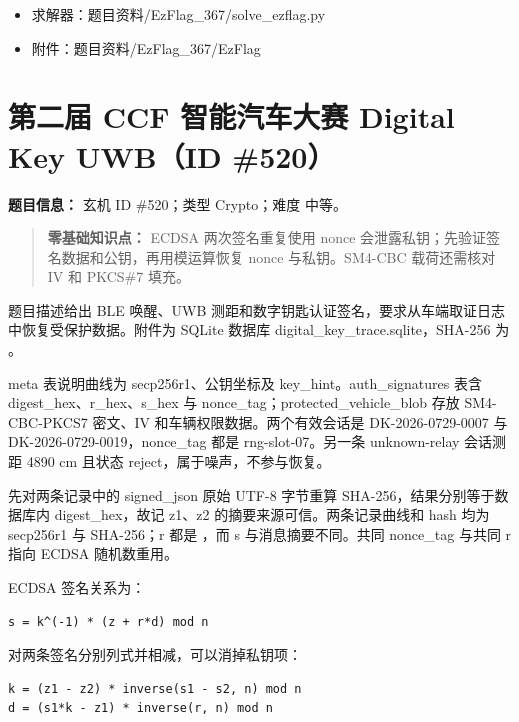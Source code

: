 \begin{itemize}
\tightlist
\item
  求解器：题目资料/EzFlag\_367/solve\_ezflag.py
\item
  附件：题目资料/EzFlag\_367/EzFlag
\end{itemize}

\section{第二届 CCF 智能汽车大赛 Digital Key UWB（ID \#520）}\label{ux7b2cux4e8cux5c4a-ccf-ux667aux80fdux6c7dux8f66ux5927ux8d5b-digital-key-uwbid-520}

\textbf{题目信息：} 玄机 ID \#520；类型 Crypto；难度 中等。

\begin{quote}
\textbf{零基础知识点：} ECDSA 两次签名重复使用 nonce 会泄露私钥；先验证签名数据和公钥，再用模运算恢复 nonce 与私钥。SM4-CBC 载荷还需核对 IV 和 PKCS\#7 填充。
\end{quote}

题目描述给出 BLE 唤醒、UWB 测距和数字钥匙认证签名，要求从车端取证日志中恢复受保护数据。附件为 SQLite 数据库 digital\_key\_trace.sqlite，SHA-256 为 。

meta 表说明曲线为 secp256r1、公钥坐标及 key\_hint。auth\_signatures 表含 digest\_hex、r\_hex、s\_hex 与 nonce\_tag；protected\_vehicle\_blob 存放 SM4-CBC-PKCS7 密文、IV 和车辆权限数据。两个有效会话是 DK-2026-0729-0007 与 DK-2026-0729-0019，nonce\_tag 都是 rng-slot-07。另一条 unknown-relay 会话测距 4890 cm 且状态 reject，属于噪声，不参与恢复。

先对两条记录中的 signed\_json 原始 UTF-8 字节重算 SHA-256，结果分别等于数据库内 digest\_hex，故记 z1、z2 的摘要来源可信。两条记录曲线和 hash 均为 secp256r1 与 SHA-256；r 都是 ，而 s 与消息摘要不同。共同 nonce\_tag 与共同 r 指向 ECDSA 随机数重用。

ECDSA 签名关系为：

\begin{verbatim}
s = k^(-1) * (z + r*d) mod n
\end{verbatim}

对两条签名分别列式并相减，可以消掉私钥项：

\begin{verbatim}
k = (z1 - z2) * inverse(s1 - s2, n) mod n
d = (s1*k - z1) * inverse(r, n) mod n
\end{verbatim}

